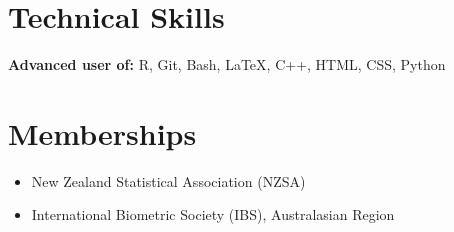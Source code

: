\documentclass[10pt,a4paper]{moderncv}
\begin{document}
\newpage

\section{Technical Skills}

\vspace{6pt}
\textbf{Advanced user of:} R, Git, Bash, \LaTeX, C++, HTML, CSS, Python

\section{Memberships}

\vspace{6pt}
\begin{itemize}
\item New Zealand Statistical Association (NZSA)
\item International Biometric Society (IBS), Australasian Region
\end{itemize}
\end{document}
